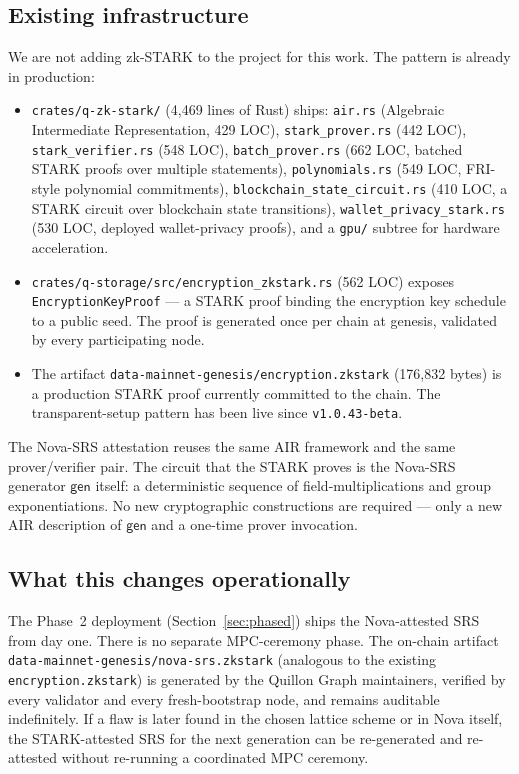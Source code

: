 \documentclass[11pt,a4paper]{article}
\begin{document}
\subsection{Existing infrastructure}

We are not adding zk-STARK to the project for this work. The pattern is
already in production:

\begin{itemize}[leftmargin=2em,topsep=0pt,itemsep=0pt]
\item \texttt{crates/q-zk-stark/} (4{,}469 lines of Rust) ships:
  \texttt{air.rs} (Algebraic Intermediate Representation, 429 LOC),
  \texttt{stark\_prover.rs} (442 LOC), \texttt{stark\_verifier.rs}
  (548 LOC), \texttt{batch\_prover.rs} (662 LOC, batched STARK proofs over
  multiple statements), \texttt{polynomials.rs} (549 LOC, FRI-style polynomial
  commitments), \texttt{blockchain\_state\_circuit.rs} (410 LOC, a STARK
  circuit over blockchain state transitions), \texttt{wallet\_privacy\_stark.rs}
  (530 LOC, deployed wallet-privacy proofs), and a \texttt{gpu/} subtree for
  hardware acceleration.
\item \texttt{crates/q-storage/src/encryption\_zkstark.rs} (562 LOC) exposes
  \texttt{EncryptionKeyProof} --- a STARK proof binding the encryption key
  schedule to a public seed. The proof is generated once per chain at
  genesis, validated by every participating node.
\item The artifact \texttt{data-mainnet-genesis/encryption.zkstark}
  (176{,}832 bytes) is a production STARK proof currently committed to
  the chain. The transparent-setup pattern has been live since
  \texttt{v1.0.43-beta}.
\end{itemize}

The Nova-SRS attestation reuses the same AIR framework and the same prover/verifier
pair. The circuit that the STARK proves is the Nova-SRS generator $\mathsf{gen}$
itself: a deterministic sequence of field-multiplications and group exponentiations.
No new cryptographic constructions are required --- only a new AIR description
of $\mathsf{gen}$ and a one-time prover invocation.

\subsection{What this changes operationally}

The Phase~2 deployment (Section~\ref{sec:phased}) ships the Nova-attested SRS from
day one. There is no separate MPC-ceremony phase. The on-chain artifact
\texttt{data-mainnet-genesis/nova-srs.zkstark} (analogous to the existing
\texttt{encryption.zkstark}) is generated by the Quillon Graph maintainers,
verified by every validator and every fresh-bootstrap node, and remains
auditable indefinitely. If a flaw is later found in the chosen lattice scheme
or in Nova itself, the STARK-attested SRS for the next generation can be
re-generated and re-attested without re-running a coordinated MPC ceremony.
\end{document}

